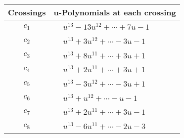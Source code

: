 \documentclass[1p]{elsarticle_modified}
\theoremstyle{definition}
\begin{document}
\begin{tabular}{m{50pt}|m{274pt}}
Crossings & \hspace{64pt}u-Polynomials at each crossing \\
\hline $$\begin{aligned}c_{1}\end{aligned}$$&$\begin{aligned}
&u^{13}-13 u^{12}+\cdots+7 u-1
\end{aligned}$\\
\hline $$\begin{aligned}c_{2}\end{aligned}$$&$\begin{aligned}
&u^{13}+3 u^{12}+\cdots-3 u-1
\end{aligned}$\\
\hline $$\begin{aligned}c_{3}\end{aligned}$$&$\begin{aligned}
&u^{13}+8 u^{11}+\cdots+3 u+1
\end{aligned}$\\
\hline $$\begin{aligned}c_{4}\end{aligned}$$&$\begin{aligned}
&u^{13}+2 u^{11}+\cdots+3 u+1
\end{aligned}$\\
\hline $$\begin{aligned}c_{5}\end{aligned}$$&$\begin{aligned}
&u^{13}-3 u^{12}+\cdots-3 u+1
\end{aligned}$\\
\hline $$\begin{aligned}c_{6}\end{aligned}$$&$\begin{aligned}
&u^{13}+u^{12}+\cdots- u-1
\end{aligned}$\\
\hline $$\begin{aligned}c_{7}\end{aligned}$$&$\begin{aligned}
&u^{13}+2 u^{11}+\cdots+3 u-1
\end{aligned}$\\
\hline $$\begin{aligned}c_{8}\end{aligned}$$&$\begin{aligned}
&u^{13}-6 u^{11}+\cdots-2 u-3
\end{aligned}$\\

\end{tabular}
\end{document}
